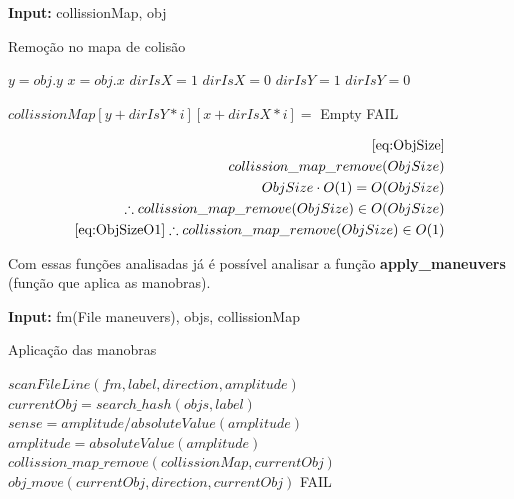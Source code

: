 \documentclass[11pt]{article}
\begin{document}
\begin{algorithm}
\textbf{Input:} collissionMap, obj
\caption{Remoção no mapa de colisão}\label{algorithmdpsmudar}
\begin{algorithmic}[1]
	\State $y = obj.y$
	\State $x = obj.x$
	{$dirIsX = 1$}
	{$dirIsX = 0$}
	{$dirIsY = 1$}
	{$dirIsY = 0$}

		\State $collissionMap[y+dirIsY*i][x+dirIsX*i] =$ Empty
		\EndIf
		\Else
		\State \Return FAIL
		\EndIf

	\EndFor
  \EndProcedure
\end{algorithmic}
\end{algorithm}

\begin{equation}
\begin{aligned}
\eqref{eq:ObjSize}\\
collission\_map\_remove(ObjSize)\\
ObjSize\cdot O(1) = O(ObjSize)\\
\therefore collission\_map\_remove(ObjSize) \in O(ObjSize) \\
\eqref{eq:ObjSizeO1} \therefore collission\_map\_remove(ObjSize) \in O(1) \\
\end{aligned}
\end{equation}

Com essas funções analisadas já é possível analisar a função \textbf{apply\_maneuvers} (função que aplica as manobras).

\begin{algorithm}
\textbf{Input:} fm(File maneuvers), objs, collissionMap
\caption{Aplicação das manobras}\label{algorithmdpsmudar}
\begin{algorithmic}[1]
      \State $scanFileLine(fm,label,direction,amplitude)$
      \State $currentObj = search\_hash(objs,label)$
      \State $sense = amplitude/absoluteValue(amplitude)$
      \State $amplitude = absoluteValue(amplitude)$
      \State $collission\_map\_remove(collissionMap,currentObj)$
      \State $obj\_move(currentObj,direction,currentObj)$
      \State \Return FAIL
      \EndIf
      \EndFor
\EndWhile
\EndProcedure
\end{algorithmic}
\end{algorithm}
\end{document}
